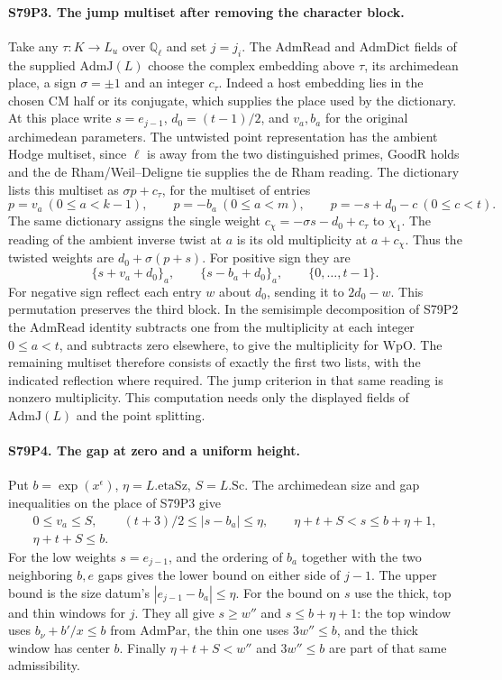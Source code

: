 \paragraph{S79P3. The jump multiset after removing the character block.}
Take any $\tau:K\to L_u$ over $\mathbb Q_\ell$ and set $j=j_i$.
The $\mathrm{AdmRead}$ and $\mathrm{AdmDict}$ fields of the supplied
$\mathrm{AdmJ}(L)$ choose the complex embedding above $\tau$, its
archimedean place, a sign $\sigma=\pm1$ and an integer $c_\tau$.
Indeed a host embedding lies in the chosen CM half or its conjugate,
which supplies the place used by the dictionary. At this place
write $s=e_{j-1}$, $d_0=(t-1)/2$, and $v_a,b_a$ for the original
archimedean parameters. The untwisted point representation has
the ambient Hodge multiset, since $\ell$ is away from the two
distinguished primes, $\mathrm{GoodR}$ holds and the
de Rham/Weil--Deligne tie supplies the de Rham reading. The dictionary
lists this multiset as $\sigma p+c_\tau$, for the multiset of entries
\[
 p=v_a\ (0\le a<k-1),\qquad p=-b_a\ (0\le a<m),\qquad
 p=-s+d_0-c\ (0\le c<t).
\]
The same dictionary assigns the single weight
$c_\chi=-\sigma s-d_0+c_\tau$ to $\chi_1$. The reading of the
ambient inverse twist at $a$ is its old multiplicity at $a+c_\chi$.
Thus the twisted weights are $d_0+\sigma(p+s)$. For positive sign
they are
\[
 \{s+v_a+d_0\}_a,\qquad \{s-b_a+d_0\}_a,\qquad
 \{0,\ldots,t-1\}.
\]
For negative sign reflect each entry $w$ about $d_0$, sending it to
$2d_0-w$. This permutation preserves the third block. In the
semisimple decomposition of S79P2 the $\mathrm{AdmRead}$ identity
subtracts one from the multiplicity at each integer $0\le a<t$,
and subtracts zero elsewhere, to give the multiplicity for
$\mathrm{WpO}$. The remaining multiset therefore consists of
exactly the first two lists, with the indicated reflection where
required. The jump criterion in that same reading is nonzero
multiplicity. This computation needs only the displayed fields of
$\mathrm{AdmJ}(L)$ and the point splitting.

\paragraph{S79P4. The gap at zero and a uniform height.}
Put $b=\exp(x^\epsilon)$, $\eta=L.\mathrm{etaSz}$, $S=L.\mathrm{Sc}$.
The archimedean size and gap inequalities on the place of S79P3 give
\[
 \begin{gathered}
 0\le v_a\le S,\qquad
 (t+3)/2\le |s-b_a|\le\eta,\qquad
 \eta+t+S<s\le b+\eta+1,\\
 \eta+t+S\le b .
 \end{gathered}
\]
For the low weights $s=e_{j-1}$, and the ordering of $b_a$ together
with the two neighboring $b,e$ gaps gives the lower bound on either
side of $j-1$. The upper bound is the size datum's
$|e_{j-1}-b_a|\le\eta$. For the bound on $s$ use the thick, top
and thin windows for $j$. They all give $s\ge w''$ and
$s\le b+\eta+1$: the top window uses
$b_\nu+b'/x\le b$ from $\mathrm{AdmPar}$, the thin one uses
$3w''\le b$, and the thick window has center $b$. Finally
$\eta+t+S<w''$ and $3w''\le b$ are part of that same admissibility.

